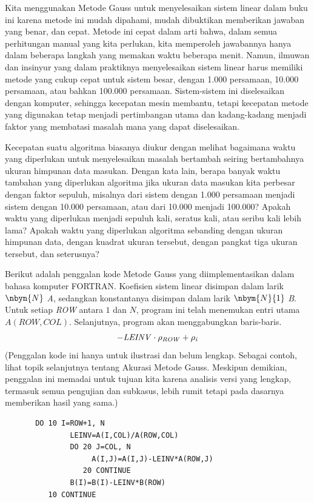%
%
Kita menggunakan Metode Gauss untuk menyelesaikan sistem linear dalam buku ini
karena metode ini mudah dipahami, mudah dibuktikan memberikan jawaban yang
benar, dan cepat.
Metode ini cepat dalam arti bahwa, dalam semua perhitungan manual yang kita
perlukan, kita memperoleh jawabannya hanya dalam beberapa langkah yang memakan
waktu beberapa menit.
Namun,
ilmuwan dan insinyur yang dalam praktiknya menyelesaikan sistem linear harus
memiliki metode yang cukup cepat untuk sistem besar, dengan 1.000 persamaan,
10.000 persamaan, atau bahkan 100.000 persamaan.
Sistem-sistem ini diselesaikan dengan komputer, sehingga kecepatan mesin
membantu, tetapi kecepatan metode yang digunakan tetap menjadi pertimbangan
utama dan kadang-kadang menjadi faktor yang membatasi masalah mana yang dapat
diselesaikan.

Kecepatan suatu algoritma biasanya diukur dengan melihat bagaimana waktu yang
diperlukan untuk menyelesaikan masalah bertambah seiring bertambahnya ukuran
himpunan data masukan.
Dengan kata lain, berapa banyak waktu tambahan yang diperlukan algoritma jika
ukuran data masukan kita perbesar dengan faktor sepuluh, misalnya dari sistem
dengan 1.000 persamaan menjadi sistem dengan 10.000 persamaan, atau dari 10.000
menjadi 100.000?
Apakah waktu yang diperlukan menjadi sepuluh kali,
seratus kali, atau seribu kali lebih lama?
Apakah waktu yang diperlukan algoritma sebanding dengan ukuran himpunan data,
dengan kuadrat ukuran tersebut, dengan pangkat tiga ukuran tersebut, dan
seterusnya?

Berikut adalah penggalan kode Metode Gauss yang diimplementasikan dalam bahasa
komputer FORTRAN.
Koefisien sistem linear disimpan dalam larik $\nbyn{N}$ \textit{A}, sedangkan
konstantanya disimpan dalam larik $\nbym{N}{1}$ \textit{B}.
Untuk setiap \textit{ROW} antara $1$ dan $N$, program ini telah menemukan entri
utama $A(ROW,COL)$.
Selanjutnya, program akan menggabungkan baris-baris.
\begin{equation*}
  -\text{\textit{LEINV}}\cdot \rho_{\text{\textit{ROW}}}
      +\rho_{\text{\textit{i}}}
\end{equation*}
(Penggalan kode ini hanya untuk ilustrasi dan belum lengkap.
Sebagai contoh, lihat topik selanjutnya tentang Akurasi Metode Gauss.
Meskipun demikian, penggalan ini memadai untuk tujuan kita karena
analisis versi yang lengkap, termasuk semua pengujian
dan subkasus, lebih rumit tetapi pada dasarnya memberikan hasil yang sama.)
\begin{center}{\small
\begin{verbatim}
       DO 10 I=ROW+1, N
               LEINV=A(I,COL)/A(ROW,COL)
               DO 20 J=COL, N
                    A(I,J)=A(I,J)-LEINV*A(ROW,J)
                  20 CONTINUE
               B(I)=B(I)-LEINV*B(ROW)
          10 CONTINUE
\end{verbatim} 
}\end{center}

